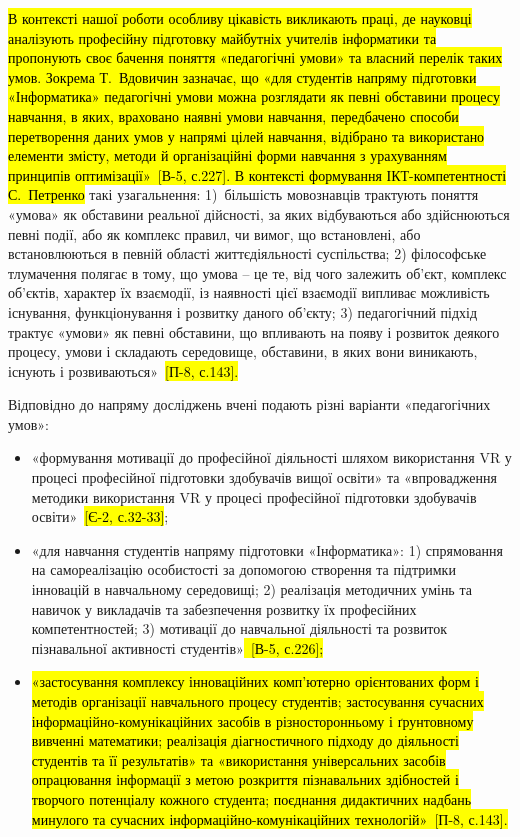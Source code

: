 \hl{В контексті нашої роботи особливу цікавість викликають праці, де науковці аналізують професійну підготовку майбутніх учителів інформатики та пропонують своє бачення поняття «педагогічні умови» та власний перелік таких умов. Зокрема Т.~Вдовичин зазначає, що «для студентів напряму підготовки «Інформатика» педагогічні умови можна розглядати як певні обставини процесу навчання, в яких, враховано наявні умови навчання, передбачено способи перетворення даних умов у напрямі цілей навчання, відібрано та використано елементи змісту, методи й організаційні форми навчання з урахуванням принципів оптимізації»~{[}В-5, с.227{]}. В контексті формування ІКТ-компетентності С.~Петренко} такі узагальнення: 1)~більшість мовознавців трактують поняття «умова» як обставини реальної дійсності, за яких відбуваються або здійснюються певні події, або як комплекс правил, чи вимог, що встановлені, або встановлюються в певній області життєдіяльності суспільства; 2) філософське тлумачення полягає в тому, що умова -- це те, від чого залежить об'єкт, комплекс об'єктів, характер їх взаємодії, із наявності цієї взаємодії випливає можливість існування, функціонування і розвитку даного об'єкту; 3) педагогічний підхід трактує «умови» як певні обставини, що впливають на появу і розвиток деякого процесу, умови і складають середовище, обставини, в яких вони виникають, існують і розвиваються»~\hl{{[}П-8, с.143{]}.}

Відповідно до напряму досліджень вчені подають різні варіанти «педагогічних умов»:

\begin{itemize}
\item
  «формування мотивації до професійної діяльності шляхом використання VR у процесі професійної підготовки здобувачів вищої освіти» та «впровадження методики використання VR у процесі професійної підготовки здобувачів освіти»~\hl{{[}Є-2, с.32-33{]}};
\item
  «для навчання студентів напряму підготовки «Інформатика»: 1) спрямовання на самореалізацію особистості за допомогою створення та підтримки інновацій в навчальному середовищі; 2) реалізація методичних умінь та навичок у викладачів та забезпечення розвитку їх професійних компетентностей; 3) мотивації до навчальної діяльності та розвиток пізнавальної активності студентів»\hl{~{[}В-5, с.226{]};}
\item
  \hl{«застосування комплексу інноваційних комп'ютерно орієнтованих форм і методів організації навчального процесу студентів; застосування сучасних інформаційно-комунікаційних засобів в різносторонньому і ґрунтовному вивченні математики; реалізація діагностичного підходу до діяльності студентів та її результатів» та «використання універсальних засобів опрацювання інформації з метою розкриття пізнавальних здібностей і творчого потенціалу кожного студента; поєднання дидактичних надбань минулого та сучасних інформаційно-комунікаційних технологій»~{[}П-8, с.143{]}.}
\end{itemize}

